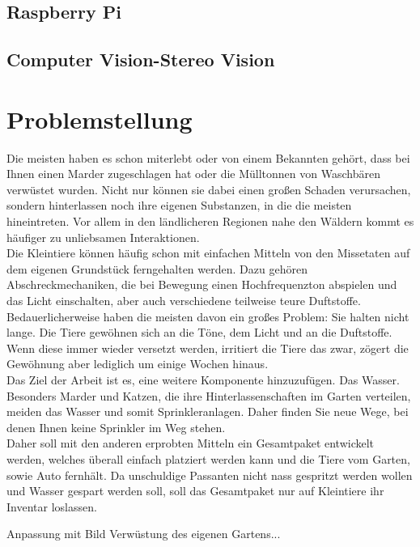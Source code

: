 \subsection{Raspberry Pi}



\subsection{Computer Vision-Stereo Vision}

\section{Problemstellung}

Die meisten haben es schon miterlebt oder von einem Bekannten gehört,
dass bei Ihnen einen Marder zugeschlagen hat oder die Mülltonnen von
Waschbären verwüstet wurden. Nicht nur können sie dabei einen großen
Schaden verursachen, sondern hinterlassen noch ihre eigenen Substanzen,
in die die meisten hineintreten. Vor allem in den ländlicheren Regionen
nahe den Wäldern kommt es häufiger zu unliebsamen Interaktionen.
\\
Die Kleintiere können häufig schon mit einfachen Mitteln von den Missetaten
auf dem eigenen Grundstück ferngehalten werden. Dazu gehören Abschreckmechaniken,
die bei Bewegung einen Hochfrequenzton abspielen und das Licht einschalten,
aber auch verschiedene teilweise teure Duftstoffe. Bedauerlicherweise haben
die meisten davon ein großes Problem: Sie halten nicht lange. Die Tiere gewöhnen
sich an die Töne, dem Licht und an die Duftstoffe. Wenn diese immer wieder
versetzt werden, irritiert die Tiere das zwar, zögert die Gewöhnung aber
lediglich um einige Wochen hinaus.
\\
Das Ziel der Arbeit ist es, eine weitere Komponente hinzuzufügen. Das Wasser.
Besonders Marder und Katzen, die ihre Hinterlassenschaften im Garten verteilen,
meiden das Wasser und somit Sprinkleranlagen. Daher finden Sie neue Wege, bei
denen Ihnen keine Sprinkler im Weg stehen.
\\
Daher soll mit den anderen erprobten Mitteln ein Gesamtpaket entwickelt werden,
welches überall einfach platziert werden kann und die Tiere vom Garten, sowie Auto
fernhält. Da unschuldige Passanten nicht nass gespritzt werden wollen und Wasser
gespart werden soll, soll das Gesamtpaket nur auf Kleintiere ihr Inventar loslassen.

Anpassung mit Bild Verwüstung des eigenen Gartens...